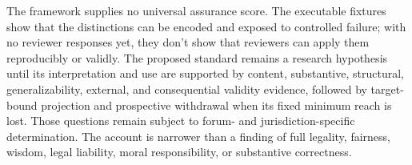 The framework supplies no universal assurance score. The executable fixtures show that the distinctions can be encoded and exposed to controlled failure; with no reviewer responses yet, they don't show that reviewers can apply them reproducibly or validly. The proposed standard remains a research hypothesis until its interpretation and use are supported by content, substantive, structural, generalizability, external, and consequential validity evidence, followed by target-bound projection and prospective withdrawal when its fixed minimum reach is lost. Those questions remain subject to forum- and jurisdiction-specific determination. The account is narrower than a finding of full legality, fairness, wisdom, legal liability, moral responsibility, or substantive correctness.
